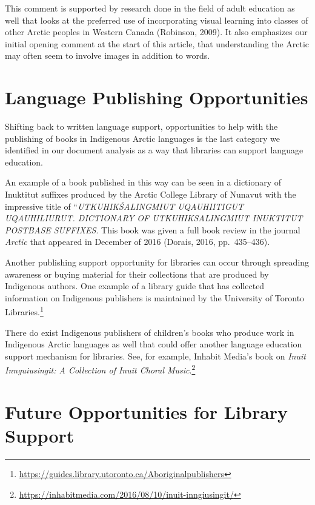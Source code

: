 \documentclass[a4paper,
fontsize=11pt,
oneside,
numbers=noperiodatend,
parskip=half-,
bibliography=totoc,
final
]{scrartcl}
\begin{document}
This comment is supported by research done in the field of adult
education as well that looks at the preferred use of incorporating
visual learning into classes of other Arctic peoples in Western Canada
(Robinson, 2009). It also emphasizes our initial opening comment at the
start of this article, that understanding the Arctic may often seem to
involve images in addition to words.

\hypertarget{language-publishing-opportunities}{%
\section{Language Publishing
Opportunities}\label{language-publishing-opportunities}}

Shifting back to written language support, opportunities to help with
the publishing of books in Indigenous Arctic languages is the last
category we identified in our document analysis as a way that libraries
can support language education.

An example of a book published in this way can be seen in a dictionary
of Inuktitut suffixes produced by the Arctic College Library of Nunavut
with the impressive title of ``\emph{UTKUHIKŠALINGMIUT UQAUHIITIGUT
UQAUHILIURUT. DICTIONARY OF UTKUHIKSALINGMIUT INUKTITUT POSTBASE
SUFFIXES}. This book was given a full book review in the journal
\emph{Arctic} that appeared in December of 2016 (Dorais, 2016,
pp.~435--436).

Another publishing support opportunity for libraries can occur through
spreading awareness or buying material for their collections that are
produced by Indigenous authors. One example of a library guide that has
collected information on Indigenous publishers is maintained by the
University of Toronto Libraries.\footnote{\url{https://guides.library.utoronto.ca/Aboriginalpublishers}}

There do exist Indigenous publishers of children's books who produce
work in Indigenous Arctic languages as well that could offer another
language education support mechanism for libraries. See, for example,
Inhabit Media's book on \emph{Inuit Innguiusingit: A Collection of Inuit
Choral Music}.\footnote{\url{https://inhabitmedia.com/2016/08/10/inuit-inngiusingit/}}

\hypertarget{future-opportunities-for-library-support}{%
\section{Future Opportunities for Library
Support}\label{future-opportunities-for-library-support}}
\end{document}
